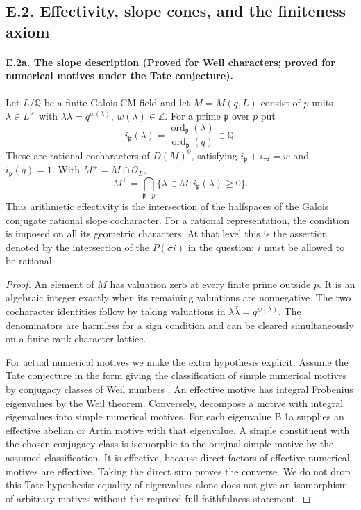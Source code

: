 \subsection{E.2. Effectivity, slope cones, and the finiteness axiom}

\paragraph{E.2a. The slope description (Proved for Weil characters;
proved for numerical motives under the Tate conjecture).}
\label{E2a}
Let $L/\mathbb Q$ be a finite Galois CM field and let $M=M(q,L)$
consist of $p$-units $\lambda\in L^\times$ with
$\lambda\bar\lambda=q^{w(\lambda)}$, $w(\lambda)\in\mathbb Z$.
For a prime $\mathfrak p$ over $p$ put
\[
 i_{\mathfrak p}(\lambda)=
 \frac{\operatorname{ord}_{\mathfrak p}(\lambda)}
      {\operatorname{ord}_{\mathfrak p}(q)}\in\mathbb Q.
\]
These are rational cocharacters of $D(M)^0$, satisfying
$i_{\mathfrak p}+i_{\tau\mathfrak p}=w$ and
$i_{\mathfrak p}(q)=1$. With $M^+=M\cap\mathcal O_L$,
\[
 M^+=\bigcap_{\mathfrak p\mid p}
       \{\lambda\in M:i_{\mathfrak p}(\lambda)\geq0\}.
\]
Thus arithmetic effectivity is the intersection of the halfspaces
of the Galois conjugate rational slope cocharacter. For a rational
representation, the condition is imposed on all its geometric
characters. At that level this is the assertion denoted by the
intersection of the $P(\sigma i)$ in the question; $i$ must be
allowed to be rational.

\begin{proof}
An element of $M$ has valuation zero at every finite prime outside
$p$. It is an algebraic integer exactly when its remaining
valuations are nonnegative. The two cocharacter identities follow
by taking valuations in $\lambda\bar\lambda=q^{w(\lambda)}$.
The denominators are harmless for a sign condition and can be
cleared simultaneously on a finite-rank character lattice.

For actual numerical motives we make the extra hypothesis explicit.
Assume the Tate conjecture in the form giving the classification of
simple numerical motives by conjugacy classes of Weil numbers
\citep[Proposition~2.6]{Milne1994}. An effective motive has integral
Frobenius eigenvalues by the Weil theorem. Conversely, decompose a
motive with integral eigenvalues into simple numerical motives. For
each eigenvalue B.1a supplies an effective abelian or Artin motive
with that eigenvalue. A simple constituent with the chosen
conjugacy class is isomorphic to the original simple motive by the
assumed classification. It is effective, because direct factors of
effective numerical motives are effective. Taking the direct sum
proves the converse. We do not drop this Tate hypothesis: equality
of eigenvalues alone does not give an isomorphism of arbitrary
motives without the required full-faithfulness statement.
\end{proof}

